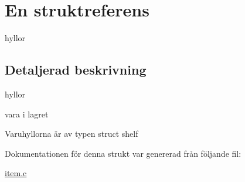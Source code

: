 \hypertarget{structEn}{}\section{En struktreferens}
\label{structEn}


hyllor  




\subsection{Detaljerad beskrivning}
hyllor 

vara i lagret

Varuhyllorna är av typen struct shelf 

Dokumentationen för denna strukt var genererad från följande fil\+:\begin{DoxyCompactItemize}
\item 
\hyperlink{item_8c}{item.\+c}\end{DoxyCompactItemize}
